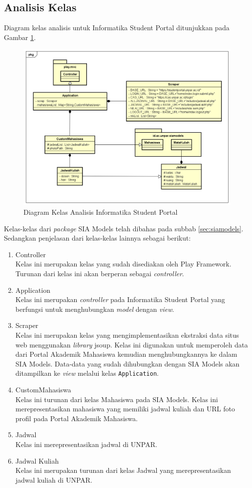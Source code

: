 \subsection{Analisis Kelas}
\label{sec:analisis_kelas}
Diagram kelas analisis untuk Informatika Student Portal ditunjukkan pada Gambar \ref{fig:3_class_diagram}.
	\begin{figure}[H]
			\centering
			\includegraphics[scale=0.5]{Gambar/class-diagram}
			\caption{Diagram Kelas Analisis Informatika Student Portal} 
			\label{fig:3_class_diagram}
		\end{figure}
Kelas-kelas dari \textit{package} SIA Models telah dibahas pada subbab \ref{sec:siamodels}. Sedangkan penjelasan dari kelas-kelas lainnya sebagai berikut:
\begin{enumerate}
	\item Controller\\
	Kelas ini merupakan kelas yang sudah disediakan oleh Play Framework. Turunan dari kelas ini akan berperan sebagai \textit{controller}.
	\item Application\\
	Kelas ini merupakan \textit{controller} pada Informatika Student Portal yang berfungsi untuk menghubungkan \textit{model} dengan \textit{view}. 
	\item Scraper\\
	Kelas ini merupakan kelas yang mengimplementasikan ekstraksi data situs web menggunakan \textit{library} jsoup. Kelas ini digunakan untuk memperoleh data dari Portal Akademik Mahasiswa kemudian menghubungkannya ke dalam SIA Models. Data-data yang sudah dihubungkan dengan SIA Models akan ditampilkan ke \textit{view} melalui kelas \texttt{Application}.
	\item CustomMahasiswa\\
	Kelas ini turunan dari kelas Mahasiswa pada SIA Models. Kelas ini merepresentasikan mahasiswa yang memiliki jadwal kuliah dan URL foto profil pada Portal Akademik Mahasiswa.
	\item Jadwal\\
	Kelas ini merepresentasikan jadwal di UNPAR.
	\item Jadwal Kuliah\\
	Kelas ini merupakan turunan dari kelas Jadwal yang merepresentasikan jadwal kuliah di UNPAR.
\end{enumerate}
		